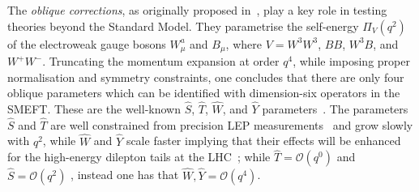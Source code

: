 \documentclass[withindex,glossary]{cam-thesis}
\begin{document}
The \textit{oblique corrections}, as originally proposed in~\cite{Peskin:1991sw,Altarelli:1991fk}, play a key role in testing theories beyond the Standard Model. They parametrise the self-energy $\Pi_V(q^2)$ of the electroweak gauge bosons $W^a_\mu$ and $B_\mu$,  where $V = W^3 W^3$, $B B$, $W^3 B$, and $W^+ W^-$.
%
Truncating the momentum expansion at order $q^4$, while imposing proper normalisation and symmetry constraints, one concludes that there are only four oblique
parameters which can be identified with dimension-six operators in the SMEFT.
%
These are the well-known  $\hat{S}$, $\hat{T}$, $\hat{W}$, and $\hat{Y}$
parameters~\cite{Barbieri:2004qk}.
%
The parameters $\hat{S}$ and $\hat{T}$ are well constrained from precision
LEP measurements~\cite{Barbieri:2004qk} and grow slowly with $q^2$,
while $\hat{W}$ and $\hat{Y}$ scale faster implying that their effects will be
enhanced for the high-energy dilepton tails at the LHC~\cite{Farina:2016rws}; 
while $\hat{T} = {\mathcal O}(q^0)$ and $\hat{S} = {\mathcal O}(q^2)$ ,
instead one has that $\hat{W},\hat{Y} = {\mathcal O}(q^4)$.
%
%
\end{document}
